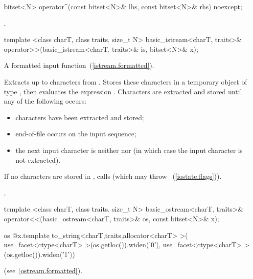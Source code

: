 %
\begin{itemdecl}
bitset<N> operator^(const bitset<N>& lhs, const bitset<N>& rhs) noexcept;
\end{itemdecl}

\begin{itemdescr}
\pnum
\returns
{}.
\end{itemdescr}

%
\begin{itemdecl}
template <class charT, class traits, size_t N>
  basic_istream<charT, traits>&
  operator>>(basic_istream<charT, traits>& is, bitset<N>& x);
\end{itemdecl}

\begin{itemdescr}
\pnum
A formatted input function~(\ref{istream.formatted}).

\pnum
\effects
Extracts up to  characters from .
Stores these characters in a temporary object  of type
,
then evaluates the expression
.
Characters are extracted and stored until any of the following occurs:

\begin{itemize}
\item
{} characters have been extracted and stored;
\item
end-of-file occurs on the input sequence;%
\item
the next input character is neither
nor
(in which case the input character is not extracted).
\end{itemize}

\pnum
If no characters are stored in , calls
(which may throw
~(\ref{iostate.flags})).

\pnum
\returns
{}.
\end{itemdescr}

%
\begin{itemdecl}
template <class charT, class traits, size_t N>
  basic_ostream<charT, traits>&
  operator<<(basic_ostream<charT, traits>& os, const bitset<N>& x);
\end{itemdecl}

\begin{itemdescr}
\pnum
\returns
\begin{codeblock}
os @\shl@ x.template to_string<charT,traits,allocator<charT> >(
  use_facet<ctype<charT> >(os.getloc()).widen('0'),
  use_facet<ctype<charT> >(os.getloc()).widen('1'))
\end{codeblock}
(see~\ref{ostream.formatted}).
\end{itemdescr}

